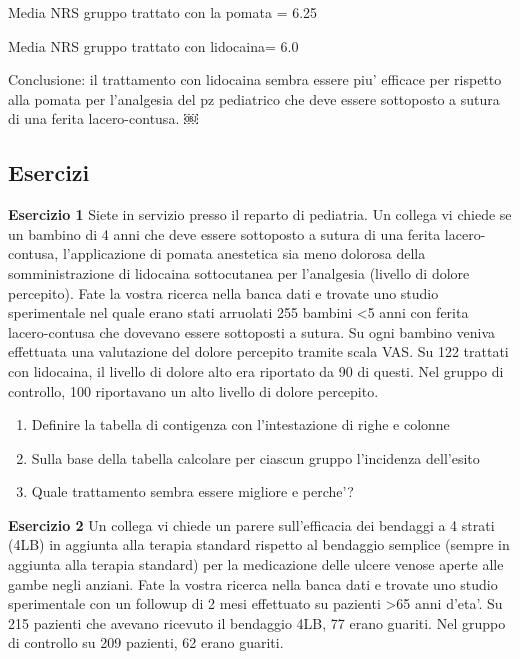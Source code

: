 \documentclass[]{book}
\begin{document}
Media NRS gruppo trattato con la pomata = 6.25

Media NRS gruppo trattato con lidocaina= 6.0

Conclusione: il trattamento con lidocaina sembra essere piu' efficace per rispetto alla pomata per l'analgesia del pz pediatrico che deve essere sottoposto a sutura di una ferita lacero-contusa.
￼

\hypertarget{esercizi-1}{%
\subsection{Esercizi}\label{esercizi-1}}

\textbf{Esercizio 1}
Siete in servizio presso il reparto di pediatria. Un collega vi chiede se un bambino di 4 anni che deve essere sottoposto a sutura di una ferita lacero-contusa, l'applicazione di pomata anestetica sia meno dolorosa della somministrazione di lidocaina sottocutanea per l'analgesia (livello di dolore percepito). Fate la vostra ricerca nella banca dati e trovate uno studio sperimentale nel quale erano stati arruolati 255 bambini \textless{}5 anni con ferita lacero-contusa che dovevano essere sottoposti a sutura. Su ogni bambino veniva effettuata una valutazione del dolore percepito tramite scala VAS. Su 122 trattati con lidocaina, il livello di dolore alto era riportato da 90 di questi. Nel gruppo di controllo, 100 riportavano un alto livello di dolore percepito.

\begin{enumerate}
\def\labelenumi{\arabic{enumi})}
\item
  Definire la tabella di contigenza con l'intestazione di righe e colonne
\item
  Sulla base della tabella calcolare per ciascun gruppo l'incidenza dell'esito
\item
  Quale trattamento sembra essere migliore e perche'?
\end{enumerate}

\textbf{Esercizio 2}
Un collega vi chiede un parere sull'efficacia dei bendaggi a 4 strati (4LB) in aggiunta alla terapia standard rispetto al bendaggio semplice (sempre in aggiunta alla terapia standard) per la medicazione delle ulcere venose aperte alle gambe negli anziani. Fate la vostra ricerca nella banca dati e trovate uno studio sperimentale con un followup di 2 mesi effettuato su pazienti \textgreater{}65 anni d'eta'. Su 215 pazienti che avevano ricevuto il bendaggio 4LB, 77 erano guariti. Nel gruppo di controllo su 209 pazienti, 62 erano guariti.
\end{document}

